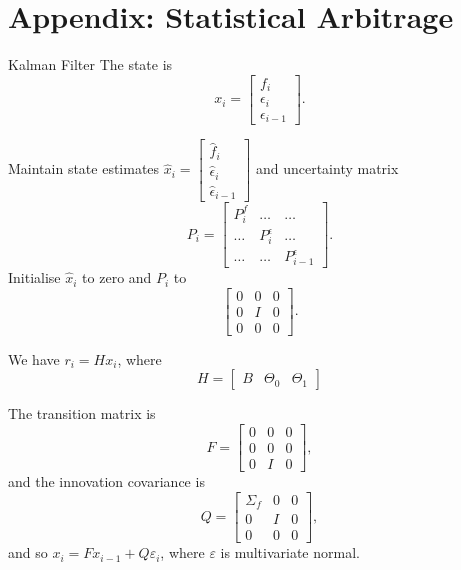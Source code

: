 \documentclass{beamer}
\begin{document}
\section{Appendix: Statistical Arbitrage}
\begin{frame}{Kalman Filter}
	The state is
	$$x_i = \left[\begin{matrix}f_i \\ \epsilon_i \\ \epsilon_{i-1}\end{matrix}\right].$$

	Maintain state estimates $\hat{x}_i = \left[\begin{matrix}\hat{f}_i \\ \hat{\epsilon}_i \\ \hat{\epsilon}_{i-1}\end{matrix}\right]$ and uncertainty matrix
	$$P_i = \left[\begin{matrix}P^f_i&\ldots&\ldots\\\ldots&P^\epsilon_i&\ldots\\\ldots&\ldots&P^\epsilon_{i-1}\end{matrix}\right].$$
	Initialise $\hat{x}_i$ to zero and $P_i$ to 
	$$\left[\begin{matrix}0 & 0 & 0 \\ 0 & I & 0 \\ 0 & 0 & 0\end{matrix}\right].$$

	We have $r_i = Hx_i$, where
	$$H = \left[\begin{matrix}B & \Theta_0 & \Theta_1\end{matrix}\right]$$

	The transition matrix is
	$$F = \left[\begin{matrix}0 & 0 & 0 \\ 0 & 0 & 0 \\ 0 & I & 0\end{matrix}\right],$$
	and the innovation covariance is
	$$Q = \left[\begin{matrix}\Sigma_f & 0 & 0 \\ 0 & I & 0 \\ 0 & 0 & 0\end{matrix}\right],$$
	and so $x_i = Fx_{i-1} + Q\varepsilon_i$, where $\varepsilon$ is multivariate normal.


\end{frame}
\end{document}
